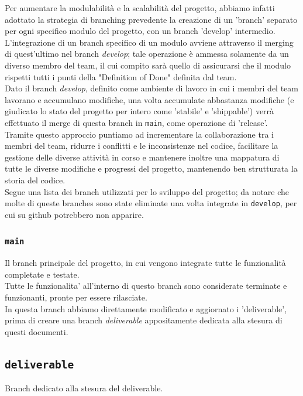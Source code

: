\documentclass{article}
\begin{document}
\noindent
Per aumentare la modulabilità e la scalabilità del progetto, abbiamo infatti adottato la strategia di branching prevedente la creazione di un 'branch' separato per ogni specifico modulo del progetto, con un branch 'develop' intermedio.\\

\noindent
L'integrazione di un branch specifico di un modulo avviene attraverso il merging di quest'ultimo nel branch \textit{develop}; tale operazione è ammessa solamente da un diverso membro del team, il cui compito sarà quello di assicurarsi che il modulo rispetti tutti i punti della "Definition of Done" definita dal team. \\

\noindent
Dato il branch \textit{develop}, definito come ambiente di lavoro in cui i membri del team lavorano e accumulano modifiche, una volta accumulate abbastanza modifiche (e giudicato lo stato del progetto per intero come 'stabile' e 'shippable') verrà effettuato il merge di questa branch in \texttt{main}, come operazione di 'release'. \\

\noindent
Tramite questo approccio puntiamo ad incrementare la collaborazione tra i membri del team, ridurre i conflitti e le inconsistenze nel codice, facilitare la gestione delle diverse attività in corso e mantenere inoltre una mappatura di tutte le diverse modifiche e progressi del progetto, mantenendo ben strutturata la storia del codice.\\

Segue una lista dei branch utilizzati per lo sviluppo del progetto; da notare che molte di queste branches sono state eliminate una volta integrate in \texttt{develop}, per cui su github potrebbero non apparire.

\subsubsection{\texttt{main}}
Il branch principale del progetto, in cui vengono integrate tutte le funzionalità completate e testate.\\
Tutte le funzionalita' all'interno di questo branch sono considerate terminate e funzionanti, pronte per essere rilasciate.\\
In questa branch abbiamo direttamente modificato e aggiornato i 'deliverable', prima di creare una branch \textit{deliverable} appositamente dedicata alla stesura di questi documenti.

\subsection{\texttt{deliverable}}
Branch dedicato alla stesura del deliverable.
\end{document}
